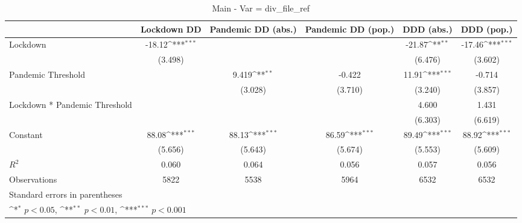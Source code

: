 \documentclass{article}
\begin{document}
{
\def\sym#1{\ifmmode^{#1}\else\(^{#1}\)\fi}
\begin{longtable}{l*{5}{c}}
\caption{Main - Var = div\_file\_ref}\\
\hline\hline\endfirsthead\hline\endhead\hline\endfoot\endlastfoot
                &\multicolumn{1}{c}{Lockdown DD}&\multicolumn{1}{c}{Pandemic DD (abs.)}&\multicolumn{1}{c}{Pandemic DD (pop.)}&\multicolumn{1}{c}{DDD (abs.)}&\multicolumn{1}{c}{DDD (pop.)}\\
\hline
Lockdown        &   -18.12\sym{***}&                  &                  &   -21.87\sym{**} &   -17.46\sym{***}\\
                &  (3.498)         &                  &                  &  (6.476)         &  (3.602)         \\
Pandemic Threshold&                  &    9.419\sym{**} &   -0.422         &    11.91\sym{***}&   -0.714         \\
                &                  &  (3.028)         &  (3.710)         &  (3.240)         &  (3.857)         \\
Lockdown * Pandemic Threshold&                  &                  &                  &    4.600         &    1.431         \\
                &                  &                  &                  &  (6.303)         &  (6.619)         \\
Constant        &    88.08\sym{***}&    88.13\sym{***}&    86.59\sym{***}&    89.49\sym{***}&    88.92\sym{***}\\
                &  (5.656)         &  (5.643)         &  (5.674)         &  (5.553)         &  (5.609)         \\
\hline
\(R^{2}\)       &    0.060         &    0.064         &    0.056         &    0.057         &    0.056         \\
Observations    &     5822         &     5538         &     5964         &     6532         &     6532         \\
\hline\hline
\multicolumn{6}{l}{\footnotesize Standard errors in parentheses}\\
\multicolumn{6}{l}{\footnotesize \sym{*} \(p<0.05\), \sym{**} \(p<0.01\), \sym{***} \(p<0.001\)}\\
\end{longtable}
}
\end{document}
